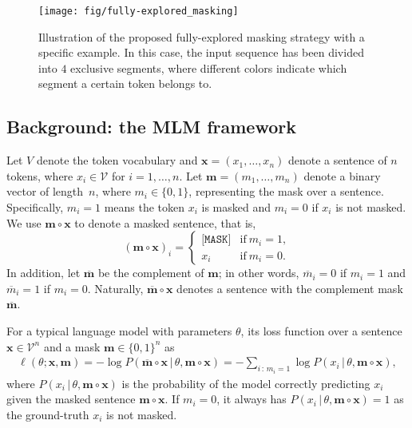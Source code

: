 \documentclass{article} \usepackage{iclr2021_conference,times}
\theoremstyle{plain}
\begin{document}
\begin{figure*}
	\centering
	\texttt{[image: fig/fully-explored\_masking]}
	\vspace{-2mm}
	\caption{Illustration of the proposed fully-explored masking strategy with a specific example. In this case, the input sequence has been divided into $4$ exclusive segments, where different colors indicate which segment a certain token belongs to. }
	\vspace{-2mm}
	\label{fig:fully-explored_masking}
	\vspace{-2mm}
\end{figure*}

\vspace{-2mm}
\subsection{Background: the MLM framework}
\vspace{-2mm}
Let $V$ denote the token vocabulary and $\mathbf{x}=(x_1,\ldots,x_n)$ denote a sentence of $n$ tokens, where $x_i\in \mathcal{V}$ for $i=1,\ldots,n$.
Let $\mathbf{m}=(m_1,\ldots,m_n)$ denote a binary vector of length~$n$, where $m_i\in\{0,1\}$, representing the mask over a sentence. 
Specifically, $m_i=1$ means the token $x_i$ is masked and $m_i=0$ if $x_i$ is not masked.
We use $\mathbf{m}\circ\mathbf{x}$ to denote a masked sentence, that is,
\[
(\mathbf{m}\circ\mathbf{x})_i = \begin{cases} \texttt{[MASK]} & \mbox{if}~ m_i=1, \\ x_i & \mbox{if}~ m_i=0. \end{cases}
\]
In addition, let $\overline{\mathbf{m}}$ be the complement of $\mathbf{m}$; in other words, $\overline{m}_i=0$ if $m_i=1$ and $\overline{m}_i=1$ if $m_i=0$. Naturally, $\overline{\mathbf{m}}\circ\mathbf{x}$ denotes a sentence with the complement mask $\overline{\mathbf{m}}$. 

For a typical language model with parameters $\theta$, its loss function over a sentence $\mathbf{x}\in \mathcal{V}^n$ and a mask $\mathbf{m}\in\{0,1\}^n$ as
\begin{align}
\ell(\theta;\mathbf{x}, \mathbf{m}) 
= -\log P(\overline{\mathbf{m}}\circ\mathbf{x} \,|\, \theta,\mathbf{m}\circ \mathbf{x}) 
= -\sum_{i\,:\, m_i=1} \log P(x_i \,|\, \theta,\mathbf{m}\circ \mathbf{x}),
\end{align}
where $P(x_i \,|\, \theta,\mathbf{m}\circ \mathbf{x})$ is the probability of the model correctly predicting $x_i$ given the masked sentence $\mathbf{m}\circ\mathbf{x}$. If $m_i=0$, it always has $P(x_i \,|\, \theta,\mathbf{m}\circ \mathbf{x})=1$ as the ground-truth $x_i$ is not masked.   
\end{document}
